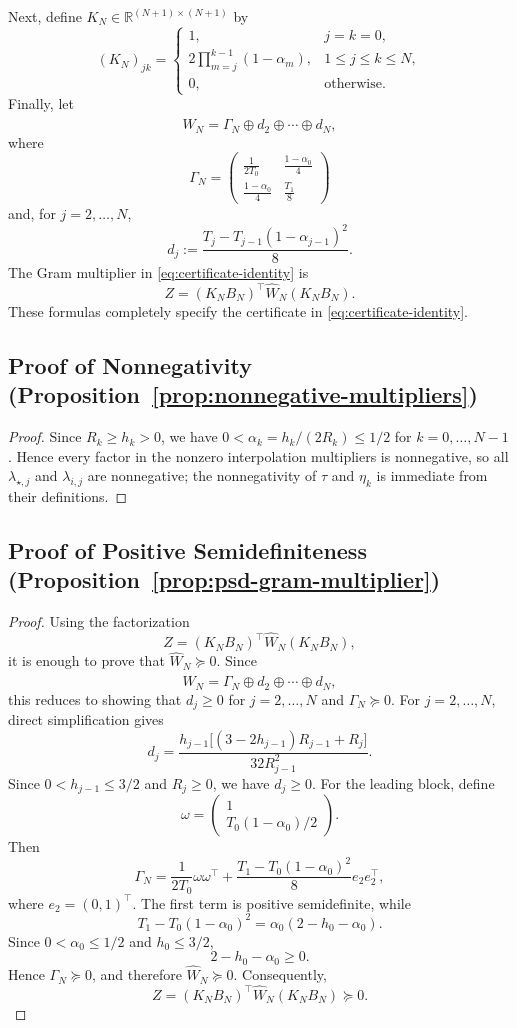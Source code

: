 \documentclass[11pt, hidelinks]{article}
\begin{document}
Next, define $K_N\in\mathbb R^{(N+1)\times(N+1)}$ by
\[ (K_N)_{jk} = \begin{cases} 1, &j=k=0, \\[0.4em]
\displaystyle 2\prod_{m=j}^{k-1}(1-\alpha_m),
&1\leq j\leq k\leq N, \\[0.6em] 0,
&\text{otherwise}. \end{cases} \]
Finally, let
\[\widehat W_N = \Gamma_N\oplus d_2\oplus\cdots\oplus d_N, \]
where
\[ \Gamma_N = \begin{pmatrix} \displaystyle\frac{1}{2T_0} & \displaystyle\frac{1-\alpha_0}{4} \\[0.7em]
\displaystyle\frac{1-\alpha_0}{4}
& \displaystyle\frac{T_1}{8}
\end{pmatrix} \]
and, for $j=2,\ldots,N$,
\[ d_j := \frac{ T_j-T_{j-1}(1-\alpha_{j-1})^2 }{8}. \]
The Gram multiplier in \eqref{eq:certificate-identity} is
\[ Z = (K_NB_N)^\top \widehat W_N (K_NB_N). \]
These formulas completely specify the certificate in \eqref{eq:certificate-identity}.


\subsection{Proof of Nonnegativity (Proposition~\ref{prop:nonnegative-multipliers})}
\begin{proof}
Since $R_k\ge h_k>0$, we have $0<\alpha_k=h_k/(2R_k)\le1/2$ for $k=0,\ldots,N-1$. Hence every factor in the nonzero interpolation multipliers is nonnegative, so all $\lambda_{\star,j}$ and $\lambda_{i,j}$ are nonnegative; the nonnegativity of $\tau$ and $\eta_k$ is immediate from their definitions.
\end{proof}

\subsection{Proof of Positive Semidefiniteness (Proposition~\ref{prop:psd-gram-multiplier})}
\begin{proof}
Using the factorization
\[Z=(K_NB_N)^\top\widehat W_N(K_NB_N),\]
it is enough to prove that $\widehat W_N\succeq0$. Since
\[\widehat W_N=\Gamma_N\oplus d_2\oplus\cdots\oplus d_N,\]
this reduces to showing that $d_j\ge0$ for $j=2,\ldots,N$ and
$\Gamma_N\succeq0$.
For $j=2,\ldots,N$, direct simplification gives
\[d_j= \frac{h_{j-1}\big[(3-2h_{j-1})R_{j-1}+R_j\big]} {32R_{j-1}^2}. \]
Since $0<h_{j-1}\le3/2$ and $R_j\ge0$, we have $d_j\ge0$.
For the leading block, define
\[ \omega=
\begin{pmatrix} 1
\\ T_0(1-\alpha_0)/2 
\end{pmatrix}. \]
Then
\[ \Gamma_N =
\frac{1}{2T_0}\omega\omega^\top + \frac{T_1-T_0(1-\alpha_0)^2}{8}e_2e_2^\top, \]
where $e_2=(0,1)^\top$.
The first term is positive semidefinite, while
\[ T_1-T_0(1-\alpha_0)^2 = \alpha_0(2-h_0-\alpha_0). \]
Since $0<\alpha_0\le1/2$ and $h_0\le3/2$,
\[ 2-h_0-\alpha_0\ge0. \]
Hence $\Gamma_N\succeq0$, and therefore $\widehat W_N\succeq0$.
Consequently,
\[ Z=(K_NB_N)^\top\widehat W_N(K_NB_N)\succeq0. \]
\end{proof}
\end{document}
